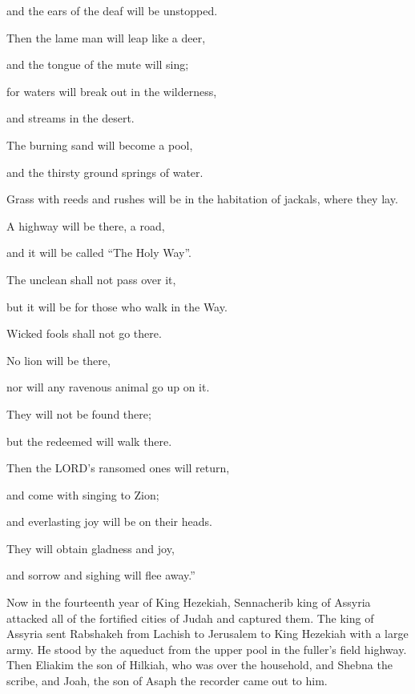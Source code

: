 and the ears of the deaf will be unstopped.

\myverse{}Then the lame man will leap like a deer,

and the tongue of the mute will sing;

for waters will break out in the wilderness,

and streams in the desert.

\myverse{}The burning sand will become a pool,

and the thirsty ground springs of water.

Grass with reeds and rushes will be in the habitation of jackals, where they lay.

\myverse{}A highway will be there, a road,

and it will be called “The Holy Way”.

The unclean shall not pass over it,

but it will be for those who walk in the Way.

Wicked fools shall not go there.

\myverse{}No lion will be there,

nor will any ravenous animal go up on it.

They will not be found there;

but the redeemed will walk there.

\myverse{}Then the LORD’s ransomed ones will return,

and come with singing to Zion;

and everlasting joy will be on their heads.

They will obtain gladness and joy,

and sorrow and sighing will flee away.”


\mychapter{} \myverse*{}Now in the fourteenth year of King Hezekiah, Sennacherib king
of Assyria attacked all of the fortified cities of Judah and captured them.
\myverse{}The king of Assyria sent Rabshakeh from Lachish to Jerusalem to King Hezekiah
with a large army. He stood by the aqueduct from the upper pool in the fuller’s field highway.
\myverse{}Then Eliakim the son of Hilkiah, who was over the household, and Shebna the
scribe, and Joah, the son of Asaph the recorder came out to him.

